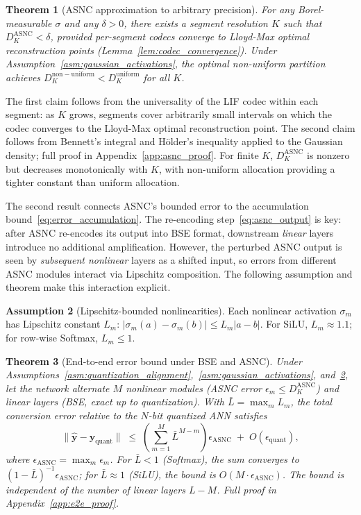 \documentclass{article}
\theoremstyle{plain}
\newtheorem{theorem}{Theorem}[section]
\theoremstyle{definition}
\newtheorem{assumption}[theorem]{Assumption}
\theoremstyle{remark}
\begin{document}
\begin{theorem}[ASNC approximation to arbitrary precision]
\label{thm:asnc_bound}
For any Borel-measurable $\sigma$ and any $\delta > 0$, there exists a segment resolution $K$ such that $D_K^{\mathrm{ASNC}} < \delta$, provided per-segment codecs converge to Lloyd-Max optimal reconstruction points (Lemma~\ref{lem:codec_convergence}). Under Assumption~\ref{asm:gaussian_activations}, the optimal non-uniform partition achieves $D_K^{\mathrm{non-uniform}} < D_K^{\mathrm{uniform}}$ for all $K$.
\end{theorem}
The first claim follows from the universality of the LIF codec within each segment: as $K$ grows, segments cover arbitrarily small intervals on which the codec converges to the Lloyd-Max optimal reconstruction point. The second claim follows from Bennett's integral and H\"{o}lder's inequality applied to the Gaussian density; full proof in Appendix~\ref{app:asnc_proof}. For finite $K$, $D_K^{\mathrm{ASNC}}$ is nonzero but decreases monotonically with $K$, with non-uniform allocation providing a tighter constant than uniform allocation.

The second result connects ASNC's bounded error to the accumulation bound~\eqref{eq:error_accumulation}. The re-encoding step~\eqref{eq:asnc_output} is key: after ASNC re-encodes its output into BSE format, downstream \emph{linear} layers introduce no additional amplification. However, the perturbed ASNC output is seen by \emph{subsequent nonlinear} layers as a shifted input, so errors from different ASNC modules interact via Lipschitz composition. The following assumption and theorem make this interaction explicit.

\begin{assumption}[Lipschitz-bounded nonlinearities]
\label{asm:lipschitz}
Each nonlinear activation $\sigma_m$ has Lipschitz constant $L_m$: $|\sigma_m(a) - \sigma_m(b)| \le L_m|a - b|$. For SiLU, $L_m \approx 1.1$; for row-wise Softmax, $L_m \le 1$.
\end{assumption}

\begin{theorem}[End-to-end error bound under BSE and ASNC]
\label{thm:e2e_bound}
Under Assumptions~\ref{asm:quantization_alignment},~\ref{asm:gaussian_activations}, and~\ref{asm:lipschitz}, let the network alternate $M$ nonlinear modules (ASNC error $\epsilon_m \le D_K^{\mathrm{ASNC}}$) and linear layers (BSE, exact up to quantization). With $\bar{L} = \max_m L_m$, the total conversion error relative to the $N$-bit quantized ANN satisfies
\begin{equation}
\label{eq:e2e_bound}
\bigl\|\hat{\mathbf{y}} - \mathbf{y}_{\mathrm{quant}}\bigr\|
\;\le\;
\left(\sum_{m=1}^{M} \bar{L}^{M-m}\right) \epsilon_{\mathrm{ASNC}}
\;+\; O(\epsilon_{\mathrm{quant}}),
\end{equation}
where $\epsilon_{\mathrm{ASNC}} = \max_m \epsilon_m$. For $\bar{L} < 1$ (Softmax), the sum converges to $(1-\bar{L})^{-1}\epsilon_{\mathrm{ASNC}}$; for $\bar{L} \approx 1$ (SiLU), the bound is $O(M \cdot \epsilon_{\mathrm{ASNC}})$. The bound is \emph{independent of the number of linear layers} $L - M$. Full proof in Appendix~\ref{app:e2e_proof}.
\end{theorem}
\end{document}
